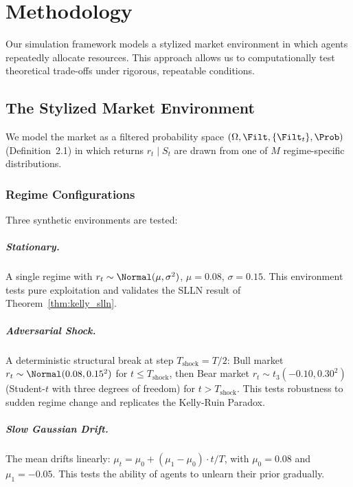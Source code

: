 \chapter{Methodology}
\label{ch:methodology}

Our simulation framework models a stylized market environment in which agents
repeatedly allocate resources.  This approach allows us to computationally
test theoretical trade-offs under rigorous, repeatable conditions.

\section{The Stylized Market Environment}

We model the market as a filtered probability space
$(\Omega, \Filt, \{\Filt_t\}, \Prob)$ (Definition~2.1) in which returns
$r_t \mid S_t$ are drawn from one of $M$ regime-specific distributions.

\subsection{Regime Configurations}

Three synthetic environments are tested:

\paragraph{Stationary.}  A single regime with
$r_t \sim \Normal(\mu, \sigma^2)$, $\mu = 0.08$, $\sigma = 0.15$.
This environment tests pure exploitation and validates the SLLN result of
Theorem~\ref{thm:kelly_slln}.

\paragraph{Adversarial Shock.}  A deterministic structural break at step
$T_{\text{shock}} = T/2$: Bull market
$r_t \sim \Normal(0.08, 0.15^2)$ for $t \leq T_{\text{shock}}$, then
Bear market $r_t \sim t_3(-0.10, 0.30^2)$ (Student-$t$ with three degrees
of freedom) for $t > T_{\text{shock}}$.  This tests robustness to sudden
regime change and replicates the Kelly-Ruin Paradox.

\paragraph{Slow Gaussian Drift.}  The mean drifts linearly:
$\mu_t = \mu_0 + (\mu_1 - \mu_0) \cdot t / T$, with $\mu_0 = 0.08$ and
$\mu_1 = -0.05$.  This tests the ability of agents to unlearn their prior
gradually.


